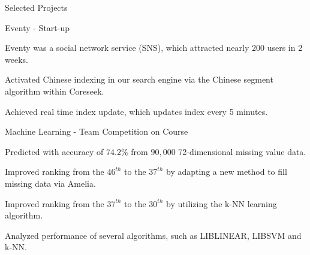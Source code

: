 \documentclass{cv}
\begin{document}
\begin{cvSection}{Selected Projects}
\begin{projectSubsection}{Eventy}{ - }{Start-up}
\item Eventy was a social network service (SNS), which attracted nearly 200 users in 2 weeks.
\item Activated Chinese indexing in our search engine via the Chinese segment algorithm within Coreseek.
\item Achieved real time index update, which updates index every 5 minutes.

\end{projectSubsection}


\begin{projectSubsection}{Machine Learning}{ - }{Team Competition on Course}

\item Predicted with accuracy of $74.2\%$ from $90,000$ 72-dimensional missing value data.
\item Improved ranking from the $46^{th}$ to the $37^{th}$ by adapting a new method to fill missing data via Amelia.
\item Improved ranking from the $37^{th}$ to the $30^{th}$ by utilizing the k-NN learning algorithm.
\item Analyzed performance of several algorithms, such as LIBLINEAR, LIBSVM and k-NN.

\end{projectSubsection}

\end{cvSection}







\end{document}
